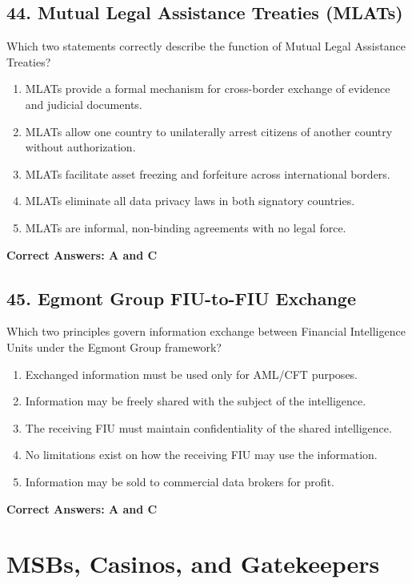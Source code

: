 \documentclass[11pt,a4paper]{article}
\begin{document}
	\subsection{44. Mutual Legal Assistance Treaties (MLATs)}
	Which two statements correctly describe the function of Mutual Legal Assistance Treaties?
	\begin{enumerate}[label=\Alph*.]
		\item MLATs provide a formal mechanism for cross-border exchange of evidence and judicial documents.
		\item MLATs allow one country to unilaterally arrest citizens of another country without authorization.
		\item MLATs facilitate asset freezing and forfeiture across international borders.
		\item MLATs eliminate all data privacy laws in both signatory countries.
		\item MLATs are informal, non-binding agreements with no legal force.
	\end{enumerate}
	\textbf{Correct Answers: A and C}
	
	\subsection{45. Egmont Group FIU-to-FIU Exchange}
	Which two principles govern information exchange between Financial Intelligence Units under the Egmont Group framework?
	\begin{enumerate}[label=\Alph*.]
		\item Exchanged information must be used only for AML/CFT purposes.
		\item Information may be freely shared with the subject of the intelligence.
		\item The receiving FIU must maintain confidentiality of the shared intelligence.
		\item No limitations exist on how the receiving FIU may use the information.
		\item Information may be sold to commercial data brokers for profit.
	\end{enumerate}
	\textbf{Correct Answers: A and C}
	
	\section{MSBs, Casinos, and Gatekeepers}
	
\end{document}
